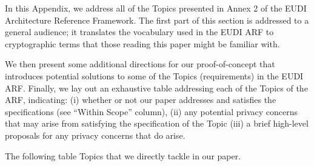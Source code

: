 



In this Appendix, we address all of the Topics presented in Annex 2 of the EUDI Architecture Reference Framework. 
The first part of this section is addressed to a general audience; it translates the vocabulary used in the EUDI ARF to cryptographic terms that those reading this paper might be familiar with.

We then present some additional directions for our proof-of-concept that introduces potential solutions to some of the Topics (requirements) in the EUDI ARF.
Finally, we lay out an exhaustive table addressing each of the Topics of the ARF, indicating:
(i) whether or not our paper addresses and satisfies the specifications (see ``Within Scope'' column),
(ii) any potential privacy concerns that may arise from satisfying the specification of the Topic
(iii) a brief high-level proposals for any privacy concerns that do arise.

The following table Topics that we directly tackle in our paper. 


